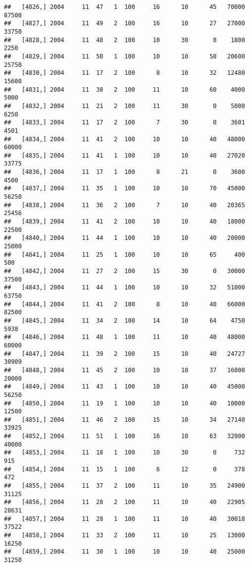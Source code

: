 \documentclass{article}\usepackage[]{graphicx}\usepackage[]{color}
\makeatletter
\newenvironment{kframe}{%
 \def\at@end@of@kframe{}%
 \ifinner\ifhmode%
  \def\at@end@of@kframe{\end{minipage}}%
  \begin{minipage}{\columnwidth}%
 \fi\fi%
 \def\FrameCommand##1{\hskip\@totalleftmargin \hskip-\fboxsep
 \colorbox{shadecolor}{##1}\hskip-\fboxsep
     \hskip-\linewidth \hskip-\@totalleftmargin \hskip\columnwidth}%
 \MakeFramed {\advance\hsize-\width
   \@totalleftmargin\z@ \linewidth\hsize
   \@setminipage}}%
 {\par\unskip\endMakeFramed%
 \at@end@of@kframe}
\newenvironment{knitrout}{}{} %
\makeatother
\begin{document}
\begin{knitrout}
\begin{kframe}
\begin{verbatim}
##   [4826,] 2004     11  47   1  100     16      10      45   70000   87500
##   [4827,] 2004     11  49   2  100     16      10      27   27000   33750
##   [4828,] 2004     11  48   2  100     10      30       0    1800    2250
##   [4829,] 2004     11  50   1  100     10      10      50   20600   25750
##   [4830,] 2004     11  17   2  100      8      10      32   12480   15600
##   [4831,] 2004     11  38   2  100     11      10      60    4000    5000
##   [4832,] 2004     11  21   2  100     11      30       0    5000    6250
##   [4833,] 2004     11  17   2  100      7      30       0    3601    4501
##   [4834,] 2004     11  41   2  100     10      10      40   48000   60000
##   [4835,] 2004     11  41   1  100     10      10      40   27020   33775
##   [4836,] 2004     11  17   1  100      8      21       0    3600    4500
##   [4837,] 2004     11  35   1  100     10      10      70   45000   56250
##   [4838,] 2004     11  36   2  100      7      10      40   20365   25456
##   [4839,] 2004     11  41   2  100     10      10      40   18000   22500
##   [4840,] 2004     11  44   1  100     10      10      40   20000   25000
##   [4841,] 2004     11  25   1  100     10      10      65     400     500
##   [4842,] 2004     11  27   2  100     15      30       0   30000   37500
##   [4843,] 2004     11  44   1  100     10      10      32   51000   63750
##   [4844,] 2004     11  41   2  100      8      10      40   66000   82500
##   [4845,] 2004     11  34   2  100     14      10      64    4750    5938
##   [4846,] 2004     11  48   1  100     11      10      40   48000   60000
##   [4847,] 2004     11  39   2  100     15      10      40   24727   30909
##   [4848,] 2004     11  45   2  100     10      10      37   16000   20000
##   [4849,] 2004     11  43   1  100     10      10      40   45000   56250
##   [4850,] 2004     11  19   1  100     10      10      40   10000   12500
##   [4851,] 2004     11  46   2  100     15      10      34   27140   33925
##   [4852,] 2004     11  51   1  100     16      10      63   32000   40000
##   [4853,] 2004     11  18   1  100     10      30       0     732     915
##   [4854,] 2004     11  15   1  100      6      12       0     378     472
##   [4855,] 2004     11  37   2  100     11      10      35   24900   31125
##   [4856,] 2004     11  28   2  100     11      10      40   22905   28631
##   [4857,] 2004     11  28   1  100     11      10      40   30018   37522
##   [4858,] 2004     11  33   2  100     11      10      25   13000   16250
##   [4859,] 2004     11  30   1  100     10      10      40   25000   31250

\end{verbatim}
\end{kframe}
\end{knitrout}
\end{document}

